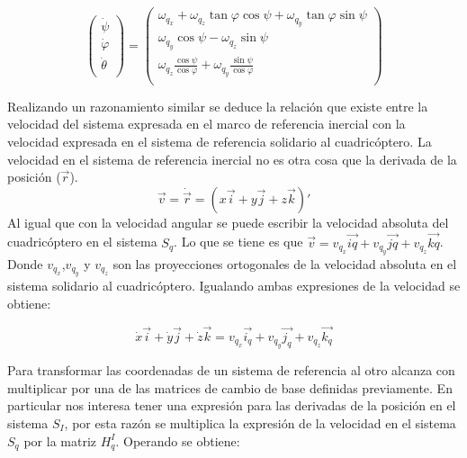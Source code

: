 \documentclass[main]{subfiles}
\begin{document}
$$
\left(\begin{array}{c}
\dot{\psi}\\
\dot{\varphi}\\
\dot{\theta}\\
\end{array}\right)=\left(\begin{array}{c}
\omega_{q_x} + \omega_{q_z}\tan\varphi \cos\psi + \omega_{q_y}\tan\varphi \sin\psi\\
\omega_{q_y}\cos \psi - \omega_{q_z}\sin\psi\\
\omega_{q_z} \frac{\cos\psi}{\cos\varphi}  + \omega_{q_y}\frac{\sin\psi}{\cos\varphi} \\
\end{array}\right)
$$

Realizando un razonamiento similar se deduce la relaci\'on que existe entre la velocidad del sistema expresada en el marco de referencia inercial con la velocidad expresada en el sistema de referencia solidario al cuadric\'optero. La velocidad en el sistema de referencia inercial no es otra cosa que la derivada de la posici\'on ($\vec{r}$). 
$$
\vec{v}=\dot{\vec{r}}=(x\vec{i}+y\vec{j}+z\vec{k})\prime
$$
Al igual que con la velocidad angular se puede escribir la velocidad absoluta del cuadric\'optero en el sistema $S_q$. Lo que se tiene es que $\vec{v} =v_{q_x}\vec{iq}+v_{q_y}\vec{jq}+v_{q_z}\vec{kq}$. Donde $v_{q_x}$,$v_{q_y}$ y $v_{q_z}$ son las proyecciones ortogonales de la velocidad absoluta en el sistema solidario al cuadric\'optero. Igualando ambas expresiones de la velocidad se obtiene: 

$$
\dot{x}\vec{i}+\dot{y}\vec{j}+\dot{z}\vec{k} = v_{q_x} \vec{i_q}+v_{q_y} \vec{j_q}+v_{q_z} \vec{k_q}
$$

Para transformar las coordenadas de un sistema de referencia al otro alcanza con multiplicar por una de las matrices de cambio de base definidas previamente. En particular nos interesa tener una expresi\'on para las derivadas de la posici\'on en el sistema $S_I$, por esta raz\'on se multiplica la expresi\'on de la velocidad en el sistema $S_q$ por la matriz $H_q^I$. Operando se obtiene:
\end{document}
